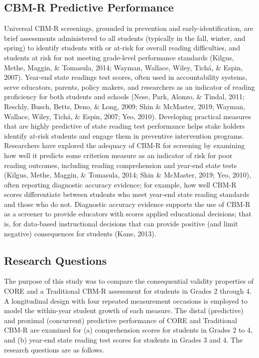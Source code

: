 \documentclass[
  english,
  man, fleqn, noextraspace]{apa6}
\begin{document}
\hypertarget{cbm-r-predictive-performance}{%
\subsection{CBM-R Predictive Performance}\label{cbm-r-predictive-performance}}

Universal CBM-R screenings, grounded in prevention and early-identification, are brief assessments administered to all students (typically in the fall, winter, and spring) to identify students with or at-risk for overall reading difficulties, and students at risk for not meeting grade-level performance standards (Kilgus, Methe, Maggin, \& Tomasula, 2014; Wayman, Wallace, Wiley, Tichá, \& Espin, 2007). Year-end state readings test scores, often used in accountability systems, serve educators, parents, policy makers, and researchers as an indicator of reading proficiency for both students and schools (Nese, Park, Alonzo, \& Tindal, 2011; Reschly, Busch, Betts, Deno, \& Long, 2009; Shin \& McMaster, 2019; Wayman, Wallace, Wiley, Tichá, \& Espin, 2007; Yeo, 2010). Developing practical measures that are highly predictive of state reading test performance helps stake holders identify at-risk students and engage them in preventive intervention programs. Researchers have explored the adequacy of CBM-R for screening by examining how well it predicts some criterion measure as an indicator of risk for poor reading outcomes, including reading comprehension and year-end state tests (Kilgus, Methe, Maggin, \& Tomasula, 2014; Shin \& McMaster, 2019; Yeo, 2010), often reporting diagnostic accuracy evidence; for example, how well CBM-R scores differentiate between students who meet year-end state reading standards and those who do not. Diagnostic accuracy evidence supports the use of CBM-R as a screener to provide educators with scores applied educational decisions; that is, for data-based instructional decisions that can provide positive (and limit negative) consequences for students (Kane, 2013).

\hypertarget{research-questions}{%
\subsection{Research Questions}\label{research-questions}}

The purpose of this study was to compare the consequential validity properties of CORE and a Traditional CBM-R assessment for students in Grades 2 through 4. A longitudinal design with four repeated measurement occasions is employed to model the within-year student growth of each measure. The distal (predictive) and proximal (concurrent) predictive performance of CORE and Traditional CBM-R are examined for (a) comprehension scores for students in Grades 2 to 4, and (b) year-end state reading test scores for students in Grades 3 and 4. The research questions are as follows.
\end{document}
